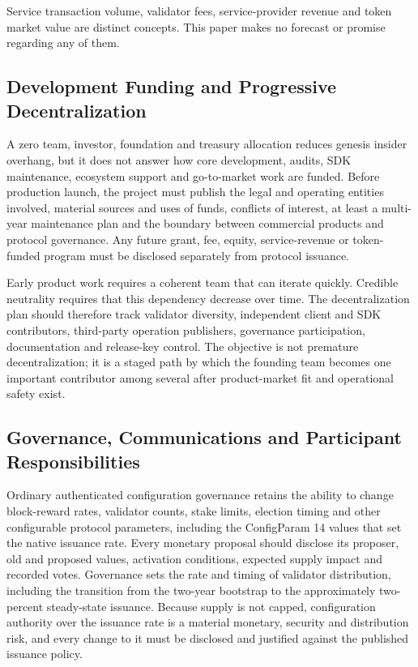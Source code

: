 \documentclass[11pt,oneside]{article}
\begin{document}
Service transaction volume, validator fees, service-provider revenue and token market value
are distinct concepts. This paper makes no forecast or promise regarding any of them.

\subsection{Development Funding and Progressive Decentralization}

A zero team, investor, foundation and treasury allocation reduces genesis insider overhang,
but it does not answer how core development, audits, SDK maintenance, ecosystem support and
go-to-market work are funded. Before production launch, the project must publish the legal and
operating entities involved, material sources and uses of funds, conflicts of interest, at
least a multi-year maintenance plan and the boundary between commercial products and protocol
governance. Any future grant, fee, equity, service-revenue or token-funded program must be
disclosed separately from protocol issuance.

Early product work requires a coherent team that can iterate quickly. Credible neutrality
requires that this dependency decrease over time. The decentralization plan should therefore
track validator diversity, independent client and SDK contributors, third-party operation
publishers, governance participation, documentation and release-key control. The objective is
not premature decentralization; it is a staged path by which the founding team becomes one
important contributor among several after product-market fit and operational safety exist.

\subsection{Governance, Communications and Participant Responsibilities}

Ordinary authenticated configuration governance retains the ability to change block-reward
rates, validator counts, stake limits, election timing and other configurable protocol
parameters, including the ConfigParam 14 values that set the native issuance rate. Every
monetary proposal should disclose its proposer, old and proposed values, activation
conditions, expected supply impact and recorded votes. Governance sets the rate and timing of
validator distribution, including the transition from the two-year bootstrap to the
approximately two-percent steady-state issuance. Because supply is not capped, configuration
authority over the issuance rate is a material monetary, security and distribution risk, and
every change to it must be disclosed and justified against the published issuance policy.
\end{document}
